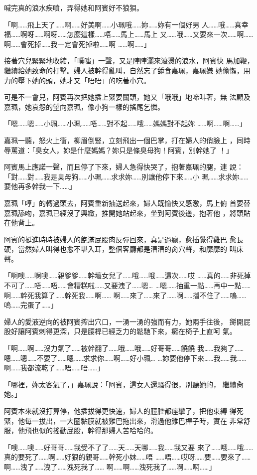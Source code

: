 喊完真的浪水疾噴，弄得她和阿賓好不狼狽。

「啊……飛上天了……啊……好美啊……小珮哦……妳……妳有一個好男
人……哦……真幸福……啊呀……啊呀……怎麼這樣……唔……馬上……馬上
又……哦……又要來一次……啊……啊……會死掉……我一定會死掉啦……啊
……啊……」

接著穴兒緊緊地收縮，「噗嗤」一聲，又是陣陣灑來滾燙的浪水，阿賓快
馬加鞭，繼續給她致命的打擊。婦人被幹得亂叫，自然忘了舔食嘉珮，嘉珮嫌
她偷懶，用力的壓下她的頭，她才又「唔唔」的吃著小穴。

可是不一會兒，阿賓再次把她插上緊要關頭，她又「哦哦」地啼叫著，無
法顧及嘉珮，她哀怨的望向嘉珮，像小狗一樣的搖尾乞憐。

「嗯……嗯……小珮……小珮……唔……對不起……哦……媽媽對不起妳
……啊……啊……」

嘉珮一聽，怒火上衝，柳眉倒豎，立刻飛出一個巴掌，打在婦人的俏臉上
，同時辱罵道：「臭女人，妳是什麼媽媽？妳只是條臭母狗！阿賓，別幹她了
！」

阿賓馬上應諾一聲，而且停了下來，婦人急得快哭了，抱著嘉珮的腿，連
說：「對……對……我是臭母狗……小珮……求求妳……別讓他停下來……小
珮……求求妳……要他再多幹我一下……」

嘉珮「哼」的轉過頭去，阿賓重新抽送起來，婦人既愉快又感激，馬上俯
首要替嘉珮舔吻，嘉珮已經沒了興緻，推開她站起來，坐到阿賓後邊，抱著他
，將頭貼在他背上。

阿賓的挺進時時被婦人的飽滿屁股肉反彈回來，真是過癮，愈插覺得雞巴
愈長硬，當然婦人叫得也愈不堪入耳，整個客廳都是漕漕的肏穴聲，和靡靡的
叫床聲。

「啊噢……啊噢……親爹爹……幹壞女兒了……哦……哦……這次……哎
……真的……非死掉不可了……唔……唔……會糟糕啦……又要洩了……嗯…
…嗯……抽重一點……再中一點……啊……幹死我算了……幹死我……啊……
啊……來了……來了……啊……擋不住了……嗚……嗚……完蛋了……」

婦人的愛液逆向的被阿賓搾出穴口，一湧一湧的強而有力，她兩手往後，
掰開屁股好讓阿賓刺得更深，只是腰桿已經乏力的鬆馳下來，癱在椅子上直呵
氣。

「啊……啊……沒力氣了……被幹翻了……哦……哦……好哥哥……饒饒
我……我夠了……嗯……嗯……不要了……嗯……求求你……啊……好小珮…
…妳要他停下來……我……我……啊……我都流乾了……唔……唔……」

「哪裡，妳太客氣了，」嘉珮說：「阿賓，這女人還騷得很，別聽她的，
繼續肏她。」

阿賓本來就沒打算停，他插拔得更快速，婦人的膣腔都痙攣了，把他束縛
得死緊，他每一拔出，一大圈黏膜就被雞巴拖出來，滑過他雞巴桿子時，實在
非常舒服，他飛也似的搖動屁股，幹得那婦人苦哈哈的。

「噢……噢……好哥哥……我受不了了……天……天哪……我……我又要
來了……哦……哦……真的要死了……啊……好狠的親哥……幹死小妹……唔
……唔……哎呀……要……要來了……啊……洩了……洩了……洩死我了……
啊……啊……洩死我了……啊……啊……」

